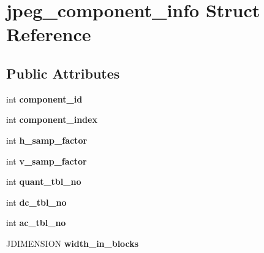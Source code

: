 \hypertarget{structjpeg__component__info}{\section{jpeg\-\_\-component\-\_\-info Struct Reference}
\label{structjpeg__component__info}
}
\subsection*{Public Attributes}
\begin{DoxyCompactItemize}
\item 
\hypertarget{structjpeg__component__info_a205782ff7ec47c58cb470f121247ea8d}{int {\bfseries component\-\_\-id}}\label{structjpeg__component__info_a205782ff7ec47c58cb470f121247ea8d}

\item 
\hypertarget{structjpeg__component__info_aa29b9e1c664a9b0b8a1c3069ad167817}{int {\bfseries component\-\_\-index}}\label{structjpeg__component__info_aa29b9e1c664a9b0b8a1c3069ad167817}

\item 
\hypertarget{structjpeg__component__info_a3a8e122fa2eee3c7bede586d371fe202}{int {\bfseries h\-\_\-samp\-\_\-factor}}\label{structjpeg__component__info_a3a8e122fa2eee3c7bede586d371fe202}

\item 
\hypertarget{structjpeg__component__info_a83b263da2a749a8fe96be728889af0df}{int {\bfseries v\-\_\-samp\-\_\-factor}}\label{structjpeg__component__info_a83b263da2a749a8fe96be728889af0df}

\item 
\hypertarget{structjpeg__component__info_a0a9d70b6a95d3ca58a34a7ea8bfefbf8}{int {\bfseries quant\-\_\-tbl\-\_\-no}}\label{structjpeg__component__info_a0a9d70b6a95d3ca58a34a7ea8bfefbf8}

\item 
\hypertarget{structjpeg__component__info_a304fa583caa0601abc7077a218988854}{int {\bfseries dc\-\_\-tbl\-\_\-no}}\label{structjpeg__component__info_a304fa583caa0601abc7077a218988854}

\item 
\hypertarget{structjpeg__component__info_adfea67573a39b232c3d82ac808539a83}{int {\bfseries ac\-\_\-tbl\-\_\-no}}\label{structjpeg__component__info_adfea67573a39b232c3d82ac808539a83}

\item 
\hypertarget{structjpeg__component__info_a059454e8192effeabc6eab34e2ad198d}{J\-D\-I\-M\-E\-N\-S\-I\-O\-N {\bfseries width\-\_\-in\-\_\-blocks}}\label{structjpeg__component__info_a059454e8192effeabc6eab34e2ad198d}


\end{DoxyCompactItemize}

